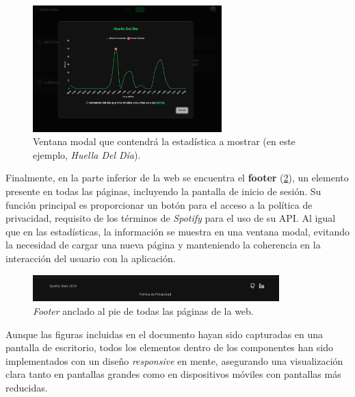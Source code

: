 \begin{figure}[H]
    \centering
    \includegraphics[width=0.65\textwidth]{figures/capturas_ui/modal.png}
    \vspace{0.3cm}
    \caption{Ventana modal que contendrá la estadística a mostrar (en este ejemplo, \textit{Huella Del Día}).}
    \label{fig:modal}
\end{figure}

Finalmente, en la parte inferior de la web se encuentra el \textbf{footer} (\ref{fig:footer}), un elemento presente en todas las páginas, incluyendo la pantalla de inicio de sesión. Su función principal es proporcionar un botón para el acceso a la política de privacidad, requisito de los términos de \textit{Spotify} para el uso de su API. Al igual que en las estadísticas, la información se muestra en una ventana modal, evitando la necesidad de cargar una nueva página y manteniendo la coherencia en la interacción del usuario con la aplicación.

\begin{figure}[H]
    \centering
    \includegraphics[width=0.85\textwidth]{figures/capturas_ui/footer.png}
    \vspace{0.3cm}
    \caption{\textit{Footer} anclado al pie de todas las páginas de la web.}
    \label{fig:footer}
\end{figure}

Aunque las figuras incluidas en el documento hayan sido capturadas en una pantalla de escritorio, todos los elementos dentro de los componentes han sido implementados con un diseño \textit{responsive} en mente, asegurando una visualización clara tanto en pantallas grandes como en dispositivos móviles con pantallas más reducidas.

\newpage

